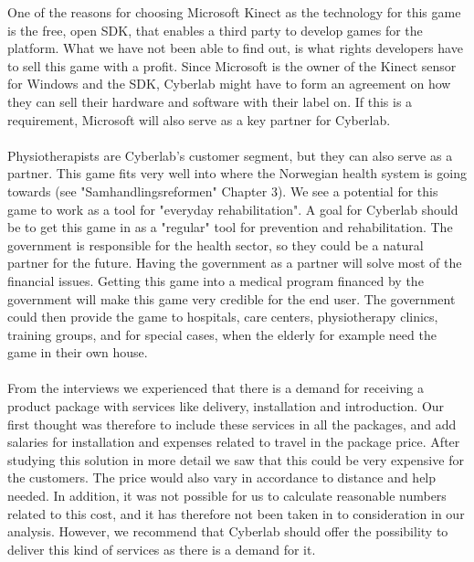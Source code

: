 One of the reasons for choosing Microsoft Kinect as the technology for this game is the free, open SDK, that enables a third party to develop games for the platform. What we have not been able to find out, is what rights developers have to sell this game with a profit. Since Microsoft is the owner of the Kinect sensor for Windows and the SDK, Cyberlab might have to form an agreement on how they can sell their hardware and software with their label on. If this is a requirement, Microsoft will also serve as a key partner for Cyberlab. \\ \\
Physiotherapists are Cyberlab's customer segment, but they can also serve as a partner. This game fits very well into where the Norwegian health system is going towards (see "Samhandlingsreformen" Chapter 3). We see a potential for this game to work as a tool for "everyday rehabilitation". A goal for Cyberlab should be to get this game in as a "regular" tool for prevention and rehabilitation. The government is responsible for the health sector, so they could be a natural partner for the future. Having the government as a partner will solve most of the financial issues. Getting this game into a medical program financed by the government will make this game very credible for the end user. The government could then provide the game to hospitals, care centers, physiotherapy clinics, training groups, and for special cases, when the elderly for example need the game in their own house. \\ \\ 
From the interviews we experienced that there is a demand for receiving a product package with services like delivery, installation and introduction. Our first thought was therefore to include these services in all the packages, and add salaries for installation and expenses related to travel in the package price. After studying this solution in more detail we saw that this could be very expensive for the customers. The price would also vary in accordance to distance and help needed. In addition, it was not possible for us to calculate reasonable numbers related to this cost, and it has therefore not been taken in to consideration in our analysis. However, we recommend that Cyberlab should offer the possibility to deliver this kind of services as there is a demand for it. \\ \\   
